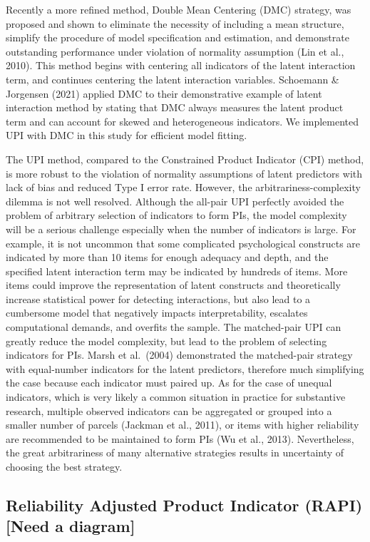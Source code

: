 \documentclass[
  man]{apa7}
\begin{document}
Recently a more refined method, Double Mean Centering (DMC) strategy, was proposed and shown to eliminate the necessity of including a mean structure, simplify the procedure of model specification and estimation, and demonstrate outstanding performance under violation of normality assumption (Lin et al., 2010). This method begins with centering all indicators of the latent interaction term, and continues centering the latent interaction variables. Schoemann \& Jorgensen (2021) applied DMC to their demonstrative example of latent interaction method by stating that DMC always measures the latent product term and can account for skewed and heterogeneous indicators. We implemented UPI with DMC in this study for efficient model fitting.

The UPI method, compared to the Constrained Product Indicator (CPI) method, is more robust to the violation of normality assumptions of latent predictors with lack of bias and reduced Type I error rate. However, the arbitrariness-complexity dilemma is not well resolved. Although the all-pair UPI perfectly avoided the problem of arbitrary selection of indicators to form PIs, the model complexity will be a serious challenge especially when the number of indicators is large. For example, it is not uncommon that some complicated psychological constructs are indicated by more than 10 items for enough adequacy and depth, and the specified latent interaction term may be indicated by hundreds of items. More items could improve the representation of latent constructs and theoretically increase statistical power for detecting interactions, but also lead to a cumbersome model that negatively impacts interpretability, escalates computational demands, and overfits the sample. The matched-pair UPI can greatly reduce the model complexity, but lead to the problem of selecting indicators for PIs. Marsh et al.~(2004) demonstrated the matched-pair strategy with equal-number indicators for the latent predictors, therefore much simplifying the case because each indicator must paired up. As for the case of unequal indicators, which is very likely a common situation in practice for substantive research, multiple observed indicators can be aggregated or grouped into a smaller number of parcels (Jackman et al., 2011), or items with higher reliability are recommended to be maintained to form PIs (Wu et al., 2013). Nevertheless, the great arbitrariness of many alternative strategies results in uncertainty of choosing the best strategy.

\hypertarget{reliability-adjusted-product-indicator-rapi-need-a-diagram}{%
\subsection{Reliability Adjusted Product Indicator (RAPI) {[}Need a diagram{]}}\label{reliability-adjusted-product-indicator-rapi-need-a-diagram}}
\end{document}
